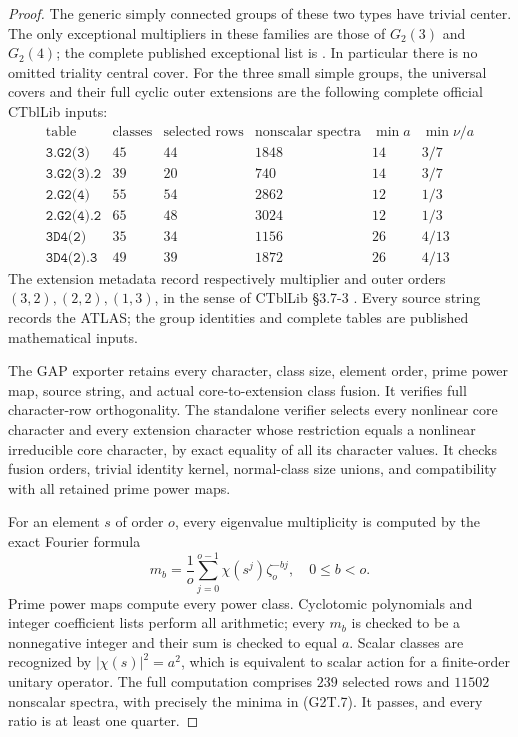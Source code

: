 \begin{proof}
The generic simply connected groups of these two types have
trivial center.  The only exceptional multipliers in these
families are those of $G_2(3)$ and $G_2(4)$; the complete
published exceptional list is \cite[Chapter~5, Table~1,
numbered p.~35]{BI:HHM}.  In particular there is no omitted
triality central cover.  For the three small simple groups,
the universal covers and their full cyclic outer extensions
are the following complete official CTblLib inputs:
\[
\begin{array}{c|r|r|r|r|c}
\text{table}&\text{classes}&\text{selected rows}&
 \text{nonscalar spectra}&\min a&\min\nu/a\\\hline
\texttt{3.G2(3)}&45&44&1848&14&3/7\\
\texttt{3.G2(3).2}&39&20&740&14&3/7\\
\texttt{2.G2(4)}&55&54&2862&12&1/3\\
\texttt{2.G2(4).2}&65&48&3024&12&1/3\\
\texttt{3D4(2)}&35&34&1156&26&4/13\\
\texttt{3D4(2).3}&49&39&1872&26&4/13
\end{array}                                                    \tag{G2T.7}
\]
The extension metadata record respectively multiplier and outer
orders $(3,2),(2,2),(1,3)$, in the sense of CTblLib
\S3.7-3 \cite{SPOR:CTblLib}.  Every source string records
the ATLAS; the group identities and complete tables are
published mathematical inputs.

The GAP exporter retains every character, class size, element
order, prime power map, source string, and actual core-to-extension
class fusion.  It verifies full character-row orthogonality.
The standalone verifier selects every nonlinear core character
and every extension character whose restriction equals a
nonlinear irreducible core character, by exact equality of
all its character values.  It checks fusion orders, trivial
identity kernel, normal-class size unions, and compatibility
with all retained prime power maps.

For an element $s$ of order $o$, every eigenvalue multiplicity is
computed by the exact Fourier formula
\[
       m_b=\frac1o\sum_{j=0}^{o-1}\chi(s^j)\zeta_o^{-bj},
                      \quad 0\le b<o.                    \tag{G2T.8}
\]
Prime power maps compute every power class.  Cyclotomic
polynomials and integer coefficient lists perform all arithmetic;
every $m_b$ is checked to be a nonnegative integer and their
sum is checked to equal $a$.  Scalar classes are recognized
by $|\chi(s)|^2=a^2$, which is equivalent to scalar action for
a finite-order unitary operator.  The full computation comprises
$239$ selected rows and $11502$ nonscalar spectra, with precisely
the minima in (G2T.7).  It passes, and every ratio is at least
one quarter.


\end{proof}

